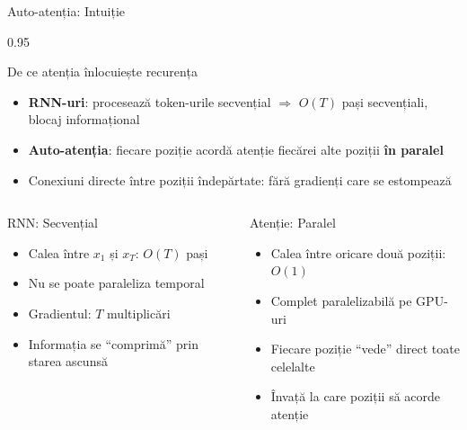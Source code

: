 \documentclass[9pt, aspectratio=169, t]{beamer}
\begin{document}
\begin{frame}{Auto-atenția: Intuiție}
    \begin{cminipage}{0.95\textwidth}
    \vspace{-3mm}
    \begin{block}{De ce atenția înlocuiește recurența}
        {\scriptsize
        \begin{itemize}\setlength{\itemsep}{0pt}
            \item \textbf{RNN-uri}: procesează token-urile secvențial $\Rightarrow$ $O(T)$ pași secvențiali, blocaj informațional
            \item \textbf{Auto-atenția}: fiecare poziție acordă atenție fiecărei alte poziții \textbf{în paralel}
            \item Conexiuni directe între poziții îndepărtate: fără gradienți care se estompează
        \end{itemize}
        }
    \end{block}
    \vspace{-3mm}
    \begin{columns}[T]
        \begin{alertblock}{RNN: Secvențial}
            {\scriptsize
            \begin{itemize}\setlength{\itemsep}{0pt}
                \item Calea între $x_1$ și $x_T$: $O(T)$ pași
                \item Nu se poate paraleliza temporal
                \item Gradientul: $T$ multiplicări
                \item Informația se ``comprimă'' prin starea ascunsă
            \end{itemize}
            }
        \end{alertblock}

        \begin{exampleblock}{Atenție: Paralel}
            {\scriptsize
            \begin{itemize}\setlength{\itemsep}{0pt}
                \item Calea între oricare două poziții: $O(1)$
                \item Complet paralelizabilă pe GPU-uri
                \item Fiecare poziție ``vede'' direct toate celelalte
                \item Învață la care poziții să acorde atenție
            \end{itemize}
            }
        \end{exampleblock}
    \end{columns}
    \end{cminipage}
\end{frame}
\end{document}
